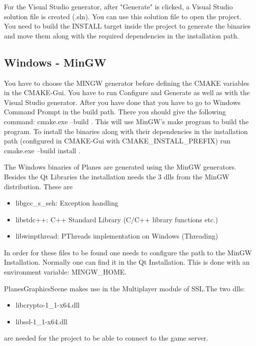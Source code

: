 For the Visual Studio generator, after "Generate" is clicked, a Visual Studio solution file is created (.sln). You can use this solution file to open the project. You need to build the INSTALL target inside the project to generate the binaries and move them along with the required dependencies in the installation path. 

\subsection {Windows - MinGW} 

You have to choose the MINGW generator before defining the CMAKE variables in the CMAKE-Gui. You have to run Configure and Generate as well as with the Visual Studio generator. After you have done that you have to go to Windows Command Prompt in the build path. There you should give the following command: cmake.exe --build . This will use MinGW's make program to build the program. To install the binaries along with their dependencies in the installation path (configured in CMAKE-Gui with CMAKE\_INSTALL\_PREFIX) run cmake.exe --build install .

The Windows binaries of Planes are generated using the MinGW generators. Besides the Qt Libraries the installation needs the 3 dlls from the MinGW distribution. These are

\begin{itemize}
	\item libgcc\_s\_seh: Exception handling
	\item libstdc++: C++ Standard Library (C/C++ library functions etc.)
	\item libwinpthread: PThreads implementation on Windows (Threading)
\end{itemize}

In order for these files to be found one needs to configure the path to the MinGW Installation. Normally one can find it in the Qt Installation.
This is done with an environment variable: MINGW\_HOME.

PlanesGraphicsScene makes use in the Multiplayer module of SSL.The two dlls:

\begin{itemize}
	\item libcrypto-1\_1-x64.dll
	\item libssl-1\_1-x64.dll
\end{itemize}

are needed for the project to be able to connect to the game server.

